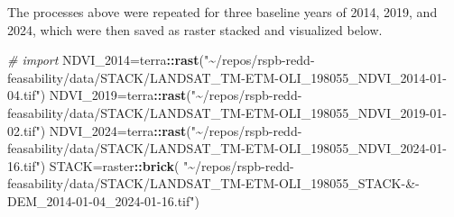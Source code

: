 \documentclass[
]{article}
\newenvironment{Shaded}{\begin{snugshade}}{\end{snugshade}}
\newcommand{\CommentTok}[1]{\textcolor[rgb]{0.56,0.35,0.01}{\textit{#1}}}
\newcommand{\FunctionTok}[1]{\textcolor[rgb]{0.13,0.29,0.53}{\textbf{#1}}}
\newcommand{\NormalTok}[1]{#1}
\newcommand{\OtherTok}[1]{\textcolor[rgb]{0.56,0.35,0.01}{#1}}
\newcommand{\SpecialCharTok}[1]{\textcolor[rgb]{0.81,0.36,0.00}{\textbf{#1}}}
\newcommand{\StringTok}[1]{\textcolor[rgb]{0.31,0.60,0.02}{#1}}
\begin{document}
The processes above were repeated for three baseline years of 2014,
2019, and 2024, which were then saved as raster stacked and visualized
below.

\begin{Shaded}
\begin{Highlighting}[]
\CommentTok{\# import}
\NormalTok{NDVI\_2014}\OtherTok{=}\NormalTok{terra}\SpecialCharTok{::}\FunctionTok{rast}\NormalTok{(}\StringTok{"\textasciitilde{}/repos/rspb{-}redd{-}feasability/data/STACK/LANDSAT\_TM{-}ETM{-}OLI\_198055\_NDVI\_2014{-}01{-}04.tif"}\NormalTok{)}
\NormalTok{NDVI\_2019}\OtherTok{=}\NormalTok{terra}\SpecialCharTok{::}\FunctionTok{rast}\NormalTok{(}\StringTok{"\textasciitilde{}/repos/rspb{-}redd{-}feasability/data/STACK/LANDSAT\_TM{-}ETM{-}OLI\_198055\_NDVI\_2019{-}01{-}02.tif"}\NormalTok{)}
\NormalTok{NDVI\_2024}\OtherTok{=}\NormalTok{terra}\SpecialCharTok{::}\FunctionTok{rast}\NormalTok{(}\StringTok{"\textasciitilde{}/repos/rspb{-}redd{-}feasability/data/STACK/LANDSAT\_TM{-}ETM{-}OLI\_198055\_NDVI\_2024{-}01{-}16.tif"}\NormalTok{)}
\NormalTok{STACK}\OtherTok{=}\NormalTok{raster}\SpecialCharTok{::}\FunctionTok{brick}\NormalTok{(}
  \StringTok{"\textasciitilde{}/repos/rspb{-}redd{-}feasability/data/STACK/LANDSAT\_TM{-}ETM{-}OLI\_198055\_STACK{-}\&{-}DEM\_2014{-}01{-}04\_2024{-}01{-}16.tif"}\NormalTok{)}


\end{Highlighting}
\end{Shaded}
\end{document}

